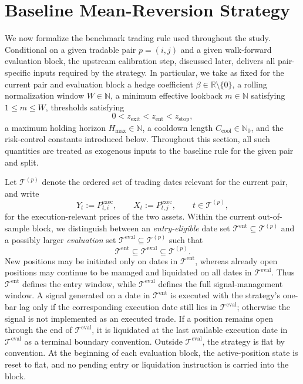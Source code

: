 \documentclass[11pt,a4paper]{article}
\begin{document}
\section{Baseline Mean-Reversion Strategy}

We now formalize the benchmark trading rule used throughout the study.
Conditional on a given tradable pair \(p=(i,j)\) and a given walk-forward
evaluation block, the upstream calibration step, discussed later, delivers all pair-specific
inputs required by the strategy. In particular, we take as fixed for the
current pair and evaluation block a hedge coefficient
\(\beta \in \mathbb R \setminus \{0\}\), a rolling normalization window
\(W \in \mathbb N\), a minimum effective lookback
\(m \in \mathbb N\) satisfying \(1 \le m \le W\), thresholds satisfying
\[
  0 < z_{\mathrm{exit}} < z_{\mathrm{ent}} < z_{\mathrm{stop}},
\]
a maximum holding horizon \(H_{\max} \in \mathbb N\), a cooldown length
\(C_{\mathrm{cool}} \in \mathbb N_0\), and the risk-control constants introduced below.
Throughout this section, all such quantities are treated as exogenous inputs to
the baseline rule for the given pair and split.

Let \(\mathcal T^{(p)}\) denote the ordered set of trading dates relevant for the
current pair, and write
\[
  Y_t := P^{\mathrm{exec}}_{t,i},
  \qquad
  X_t := P^{\mathrm{exec}}_{t,j},
  \qquad t \in \mathcal T^{(p)},
\]
for the execution-relevant prices of the two assets. Within the current
out-of-sample block, we distinguish between an \emph{entry-eligible} date set
\(\mathcal T^{\mathrm{ent}} \subseteq \mathcal T^{(p)}\) and a possibly larger
\emph{evaluation} set \(\mathcal T^{\mathrm{eval}} \subseteq \mathcal T^{(p)}\) such
that
\[
  \mathcal T^{\mathrm{ent}} \subseteq \mathcal T^{\mathrm{eval}} \subseteq \mathcal T^{(p)}.
\]
New positions may be initiated only on dates in
\(\mathcal T^{\mathrm{ent}}\), whereas already open positions may continue to
be managed and liquidated on all dates in \(\mathcal T^{\mathrm{eval}}\).
Thus \(\mathcal T^{\mathrm{ent}}\) defines the entry window, while
\(\mathcal T^{\mathrm{eval}}\) defines the full signal-management window. A
signal generated on a date in \(\mathcal T^{\mathrm{ent}}\) is executed with
the strategy's one-bar lag only if the corresponding execution date still lies
in \(\mathcal T^{\mathrm{eval}}\); otherwise the signal is not implemented as an executed trade. If a
position remains open through the end of \(\mathcal T^{\mathrm{eval}}\), it is
liquidated at the last available execution date in
\(\mathcal T^{\mathrm{eval}}\) as a terminal boundary convention. Outside
\(\mathcal T^{\mathrm{eval}}\), the strategy is flat by convention. At the
beginning of each evaluation block, the active-position state is reset to flat,
and no pending entry or liquidation instruction is carried into the block.
\end{document}
